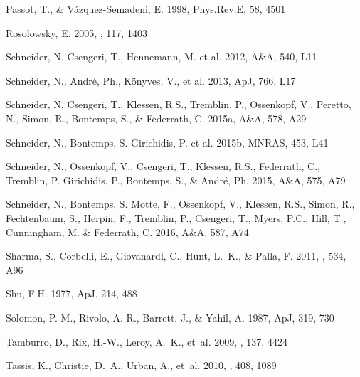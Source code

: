 \documentclass{aa}
\begin{document}
\begin{thebibliography}{}
 Passot, T., \& V\'azquez-Semadeni,
    E. 1998, Phys.Rev.E, 58, 4501

{Rosolowsky}, E. 2005, \pasp, 117, 1403

 Schneider, N. Csengeri, T.,
    Hennemann, M. et al. 2012, A\&A, 540, L11

 Schneider, N., Andr\'e, Ph., K\"onyves,
    V., et al. 2013, ApJ, 766, L17

 Schneider, N. Csengeri, T.,
    Klessen, R.S., Tremblin, P., Ossenkopf, V., Peretto, N., Simon, R.,
    Bontemps, S., \& Federrath, C. 2015a, A\&A, 578, A29

 Schneider, N., Bontemps, S.
    Girichidis, P. et al. 2015b, MNRAS, 453, L41

 Schneider, N., Ossenkopf, V., Csengeri,
    T., Klessen, R.S., Federrath, C., Tremblin, P. Girichidis, P., Bontemps, S., \&
    Andr\'e, Ph. 2015, A\&A, 575, A79

 Schneider, N., Bontemps, S.
    Motte, F., Ossenkopf, V., Klessen, R.S., Simon, R., Fechtenbaum, S., Herpin, F.,
    Tremblin, P., Csengeri, T., Myers, P.C., Hill, T., Cunningham, M. \& Federrath, C.
    2016, A\&A, 587, A74

{Sharma}, S., {Corbelli}, E., {Giovanardi}, C., {Hunt}, L.~K., \& {Palla}, F.
  2011, \aap, 534, A96

 Shu, F.H. 1977, ApJ, 214, 488

 Solomon, P. M., Rivolo, A. R., Barrett, J., \& Yahil, A. 1987, ApJ, 319, 730

{Tamburro}, D., {Rix}, H.-W., {Leroy}, A.~K., {et~al.} 2009, \aj, 137, 4424

{Tassis}, K., {Christie}, D.~A., {Urban}, A., {et~al.} 2010, \mnras, 408, 1089


\end{thebibliography}
\end{document}
